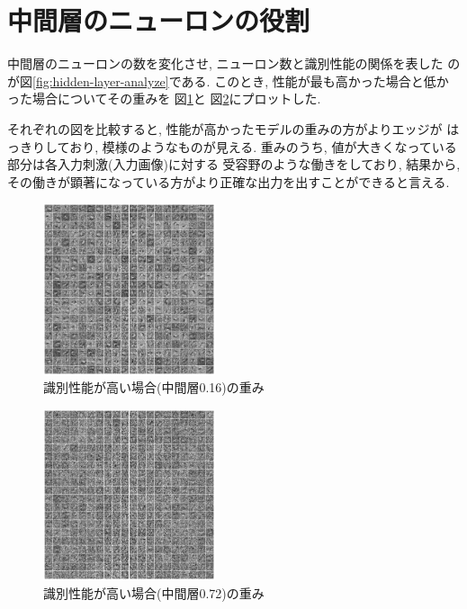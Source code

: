 \documentclass[10pt,a4paper,twocolumn]{jarticle}
\begin{document}

\section{中間層のニューロンの役割}
中間層のニューロンの数を変化させ, ニューロン数と識別性能の関係を表した
のが図\ref{fig:hidden-layer-analyze}である. 
このとき, 性能が最も高かった場合と低かった場合についてその重みを
図\ref{fig:hidden-layer-analyze-img-0.16}と
図\ref{fig:hidden-layer-analyze-img-0.72}にプロットした. 

それぞれの図を比較すると, 性能が高かったモデルの重みの方がよりエッジが
はっきりしており, 模様のようなものが見える. 
重みのうち, 値が大きくなっている部分は各入力刺激(入力画像)に対する
受容野のような働きをしており, 結果から, 
その働きが顕著になっている方がより正確な出力を出すことができると言える. 
\begin{figure}[htbp] 
  \centering
  \includegraphics[width=0.45\textwidth]{assets/img/n_hidden_test_mnist_image_nsmpl150000_nh0.16.eps}
  \caption{識別性能が高い場合(中間層0.16)の重み}
  \label{fig:hidden-layer-analyze-img-0.16}
\end{figure}
\begin{figure}[htbp] 
  \centering
  \includegraphics[width=0.45\textwidth]{assets/img/n_hidden_test_mnist_image_nsmpl150000_nh0.72.eps}
  \caption{識別性能が高い場合(中間層0.72)の重み}
  \label{fig:hidden-layer-analyze-img-0.72}
\end{figure}
\end{document}
